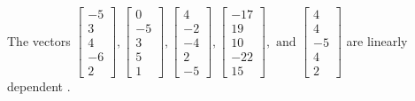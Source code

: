 \begin{exercise}
\begin{exerciseStatement}
  \end{exerciseStatement}
  \begin{exerciseAnswer}
   The vectors \(\left[\begin{array}{r}
-5 \\
3 \\
4 \\
-6 \\
2
\end{array}\right] , \left[\begin{array}{r}
0 \\
-5 \\
3 \\
5 \\
1
\end{array}\right] , \left[\begin{array}{r}
4 \\
-2 \\
-4 \\
2 \\
-5
\end{array}\right] , \left[\begin{array}{r}
-17 \\
19 \\
10 \\
-22 \\
15
\end{array}\right] , \text{ and } \left[\begin{array}{r}
4 \\
4 \\
-5 \\
4 \\
2
\end{array}\right]\) are 
  	 linearly dependent  .
  


  \end{exerciseAnswer}
\end{exercise}